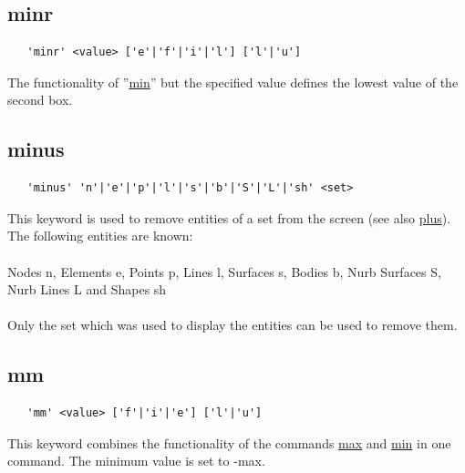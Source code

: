 \documentclass{article}
\providecommand{\htmlref}[2]{\hyperref[#2]{#1}}
\begin{document}
\subsection{\label{minr}minr}
\begin{verbatim}
   'minr' <value> ['e'|'f'|'i'|'l'] ['l'|'u']
\end{verbatim}
The functionality of ''\htmlref{min}{min}'' but the specified value defines the lowest value of the second box.

\subsection{\label{minus}minus}
\begin{verbatim}
   'minus' 'n'|'e'|'p'|'l'|'s'|'b'|'S'|'L'|'sh' <set> 
\end{verbatim}
This keyword is used to remove entities of a set from the screen (see also \htmlref{plus}{plus}). The following entities are known:\\\\
Nodes n, Elements e, Points p, Lines l, Surfaces s, Bodies b, Nurb Surfaces S, Nurb Lines L and Shapes sh\\\\Only the set which was used to display the entities can be used to remove them.
 
\subsection{\label{mm}mm}
\begin{verbatim}
   'mm' <value> ['f'|'i'|'e'] ['l'|'u']
\end{verbatim}
This keyword combines the functionality of the commands \htmlref{max}{max} and \htmlref{min}{min} in one command. The minimum value is set to -max.
\end{document}
